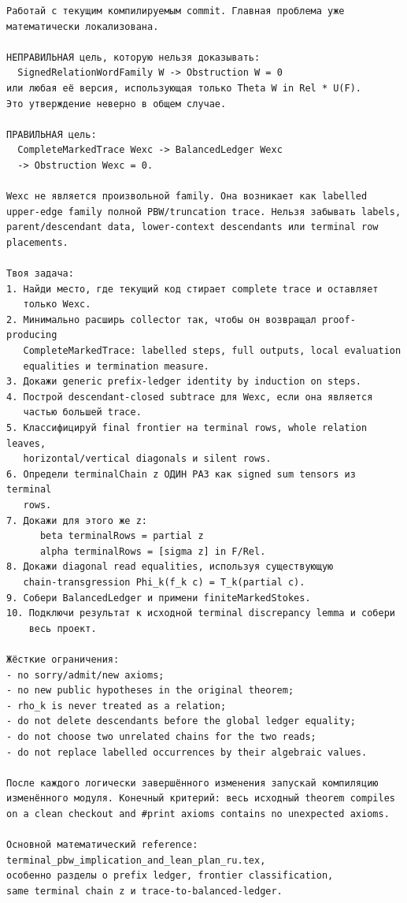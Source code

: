 \documentclass[11pt,a4paper]{article}
\theoremstyle{definition}
\theoremstyle{remark}
\begin{document}
\begin{Verbatim}[fontsize=\small,breaklines=true,breakanywhere=true,frame=single,framesep=2mm]
Работай с текущим компилируемым commit. Главная проблема уже
математически локализована.

НЕПРАВИЛЬНАЯ цель, которую нельзя доказывать:
  SignedRelationWordFamily W -> Obstruction W = 0
или любая её версия, использующая только Theta W in Rel * U(F).
Это утверждение неверно в общем случае.

ПРАВИЛЬНАЯ цель:
  CompleteMarkedTrace Wexc -> BalancedLedger Wexc
  -> Obstruction Wexc = 0.

Wexc не является произвольной family. Она возникает как labelled
upper-edge family полной PBW/truncation trace. Нельзя забывать labels,
parent/descendant data, lower-context descendants или terminal row
placements.

Твоя задача:
1. Найди место, где текущий код стирает complete trace и оставляет
   только Wexc.
2. Минимально расширь collector так, чтобы он возвращал proof-producing
   CompleteMarkedTrace: labelled steps, full outputs, local evaluation
   equalities и termination measure.
3. Докажи generic prefix-ledger identity by induction on steps.
4. Построй descendant-closed subtrace для Wexc, если она является
   частью большей trace.
5. Классифицируй final frontier на terminal rows, whole relation leaves,
   horizontal/vertical diagonals и silent rows.
6. Определи terminalChain z ОДИН РАЗ как signed sum tensors из terminal
   rows.
7. Докажи для этого же z:
      beta terminalRows = partial z
      alpha terminalRows = [sigma z] in F/Rel.
8. Докажи diagonal read equalities, используя существующую
   chain-transgression Phi_k(f_k c) = T_k(partial c).
9. Собери BalancedLedger и примени finiteMarkedStokes.
10. Подключи результат к исходной terminal discrepancy lemma и собери
    весь проект.

Жёсткие ограничения:
- no sorry/admit/new axioms;
- no new public hypotheses in the original theorem;
- rho_k is never treated as a relation;
- do not delete descendants before the global ledger equality;
- do not choose two unrelated chains for the two reads;
- do not replace labelled occurrences by their algebraic values.

После каждого логически завершённого изменения запускай компиляцию
изменённого модуля. Конечный критерий: весь исходный theorem compiles
on a clean checkout and #print axioms contains no unexpected axioms.

Основной математический reference:
terminal_pbw_implication_and_lean_plan_ru.tex,
особенно разделы о prefix ledger, frontier classification,
same terminal chain z и trace-to-balanced-ledger.
\end{Verbatim}
\end{document}
